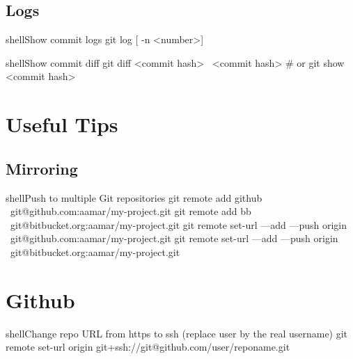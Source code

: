 \documentclass[10pt,a4paper]{article}
\begin{document}
\begin{multicols}{3}
\subsection{Logs}

\begin{codebox}{shell}{Show commit logs}
git log [ -n <number>]

\end{codebox}

\begin{codebox}{shell}{Show commit diff}
git diff <commit hash>~   <commit hash>
# or 
 git show <commit hash>

\end{codebox}

\section{Useful Tips}

\subsection{Mirroring}

\begin{codebox}{shell}{Push to multiple Git repositories}
git remote add github \
      git@github.com:aamar/my-project.git 
git remote add bb \ 
      git@bitbucket.org:aamar/my-project.git 
git remote set-url ---add ---push origin \
      git@github.com:aamar/my-project.git
git remote set-url ---add ---push origin \
      git@bitbucket.org:aamar/my-project.git

\end{codebox}

\section{Github}

\begin{codebox}{shell}{Change repo URL from https to ssh (replace user by the real username)}
git remote set-url origin git+ssh://git@github.com/user/reponame.git

\end{codebox}


\AtNextBibliography{\footnotesize}
\printbibliography  
\end{multicols}
\end{document}

